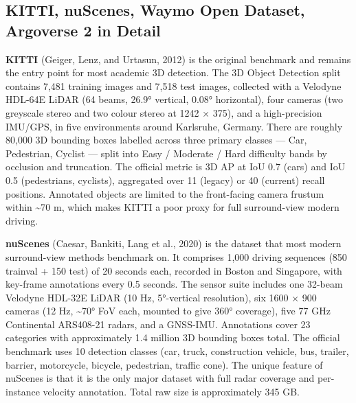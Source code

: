 \subsection{KITTI, nuScenes, Waymo Open Dataset, Argoverse 2 in Detail}\label{kitti-nuscenes-waymo-open-dataset-argoverse-2-in-detail}

\textbf{KITTI} (Geiger, Lenz, and Urtasun, 2012) is the original benchmark and remains the entry point for most academic 3D detection. The 3D Object Detection split contains 7,481 training images and 7,518 test images, collected with a Velodyne HDL-64E LiDAR (64 beams, 26.9° vertical, 0.08° horizontal), four cameras (two greyscale stereo and two colour stereo at 1242 × 375), and a high-precision IMU/GPS, in five environments around Karlsruhe, Germany. There are roughly 80,000 3D bounding boxes labelled across three primary classes --- Car, Pedestrian, Cyclist --- split into Easy / Moderate / Hard difficulty bands by occlusion and truncation. The official metric is 3D AP at IoU 0.7 (cars) and IoU 0.5 (pedestrians, cyclists), aggregated over 11 (legacy) or 40 (current) recall positions. Annotated objects are limited to the front-facing camera frustum within \textasciitilde70 m, which makes KITTI a poor proxy for full surround-view modern driving.

\textbf{nuScenes} (Caesar, Bankiti, Lang et al., 2020) is the dataset that most modern surround-view methods benchmark on. It comprises 1,000 driving sequences (850 trainval + 150 test) of 20 seconds each, recorded in Boston and Singapore, with key-frame annotations every 0.5 seconds. The sensor suite includes one 32-beam Velodyne HDL-32E LiDAR (10 Hz, 5°-vertical resolution), six 1600 × 900 cameras (12 Hz, \textasciitilde70° FoV each, mounted to give 360° coverage), five 77 GHz Continental ARS408-21 radars, and a GNSS-IMU. Annotations cover 23 categories with approximately 1.4 million 3D bounding boxes total. The official benchmark uses 10 detection classes (car, truck, construction vehicle, bus, trailer, barrier, motorcycle, bicycle, pedestrian, traffic cone). The unique feature of nuScenes is that it is the only major dataset with full radar coverage and per-instance velocity annotation. Total raw size is approximately 345 GB.

